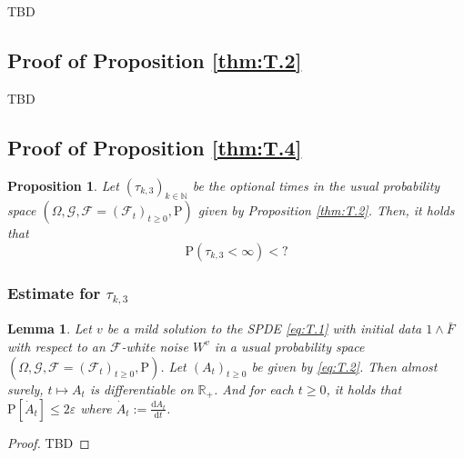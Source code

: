 \documentclass[12pt,a4paper]{amsart}
\numberwithin{equation}{section}
\theoremstyle{plain}
\newtheorem{lemma}[theorem]{Lemma}
\newtheorem{proposition}[theorem]{Proposition}
\theoremstyle{remark}
\begin{document}
{\color{blue} TBD}

\subsection{Proof of Proposition \ref{thm:T.2}}

{\color{blue} TBD}

\subsection{Proof of Proposition \ref{thm:T.4}} \label{sec:T.4}

\begin{proposition} \label{thm:T.73}
	Let $(\tau_{k,3})_{k\in \mathbb N}$ be the optional times in the usual probability space $(\Omega, \mathcal G, \mathcal F = (\mathcal F_t)_{t\geq 0}, \mathrm P)$ given by Proposition \ref{thm:T.2}.
	Then, it holds that
\[
	\mathrm P(\tau_{k,3} < \infty) < ?
\]
\end{proposition}

\subsubsection{Estimate for $\tau_{k,3}$}
\begin{lemma} \label{thm:T.731}
	Let $v$ be a mild solution to the SPDE \eqref{eq:T.1} with initial data $1\wedge\bar F$ with respect to an $\mathcal F$-white noise $W^v$ in a usual probability space $(\Omega, \mathcal G, \mathcal F = (\mathcal F_t)_{t\geq 0}, \mathrm P)$.
	Let $(A_t)_{t\geq 0}$ be given by \eqref{eq:T.2}.
	Then almost surely, $t\mapsto A_t$ is differentiable on $\mathbb R_+$. 
	And for each $t\geq 0$, it holds that $\mathrm P[\dot A_t] \leq 2\varepsilon$ where $\dot A_t := \frac{\mathrm dA_t}{\mathrm dt}$.
\end{lemma}
\begin{proof}
	\color{blue} TBD
\end{proof}
\end{document}
